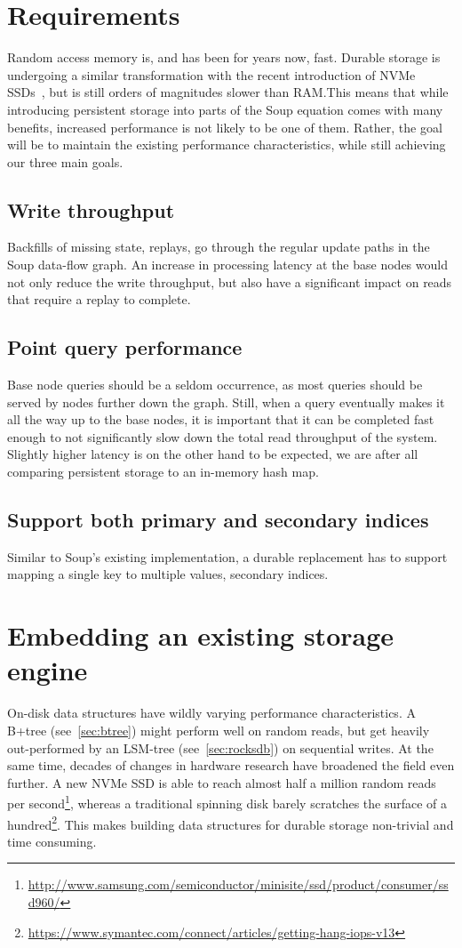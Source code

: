 \section{Requirements}\label{sec:requirements}
Random access memory is, and has been for years now, fast. Durable storage is
undergoing a similar transformation with the recent introduction of NVMe
SSDs~\cite{nvme}, but is still orders of magnitudes slower than RAM.\@ This
means that while introducing persistent storage into parts of the Soup equation
comes with many benefits, increased performance is not likely to be one of them.
Rather, the goal will be to maintain the existing performance characteristics,
while still achieving our three main goals.

\subsection{Write throughput}
Backfills of missing state, replays, go through the regular update paths in the
Soup data-flow graph. An increase in processing latency at the base nodes would
not only reduce the write throughput, but also have a significant impact on
reads that require a replay to complete.

\subsection{Point query performance}
Base node queries should be a seldom occurrence, as most queries should be
served by nodes further down the graph. Still, when a query eventually makes it
all the way up to the base nodes, it is important that it can be completed fast
enough to not significantly slow down the total read throughput of the system.
Slightly higher latency is on the other hand to be expected, we are after all
comparing persistent storage to an in-memory hash map.

\subsection{Support both primary and secondary indices}
Similar to Soup's existing  implementation, a durable replacement
has to support mapping a single key to multiple values, \ie secondary indices.

\section{Embedding an existing storage engine}
On-disk data structures have wildly varying performance characteristics. A
B+tree (see~\ref{sec:btree}) might perform well on random reads, but get heavily
out-performed by an LSM-tree (see~\ref{sec:rocksdb}) on sequential writes. At
the same time, decades of changes in hardware research have broadened the field
even further. A new NVMe SSD is able to reach almost half a million random reads
per
second\footnote{\url{http://www.samsung.com/semiconductor/minisite/ssd/product/consumer/ssd960/}},
whereas a traditional spinning disk barely scratches the surface of a
hundred\footnote{\url{https://www.symantec.com/connect/articles/getting-hang-iops-v13}}.
This makes building data structures for durable storage non-trivial and time
consuming.

